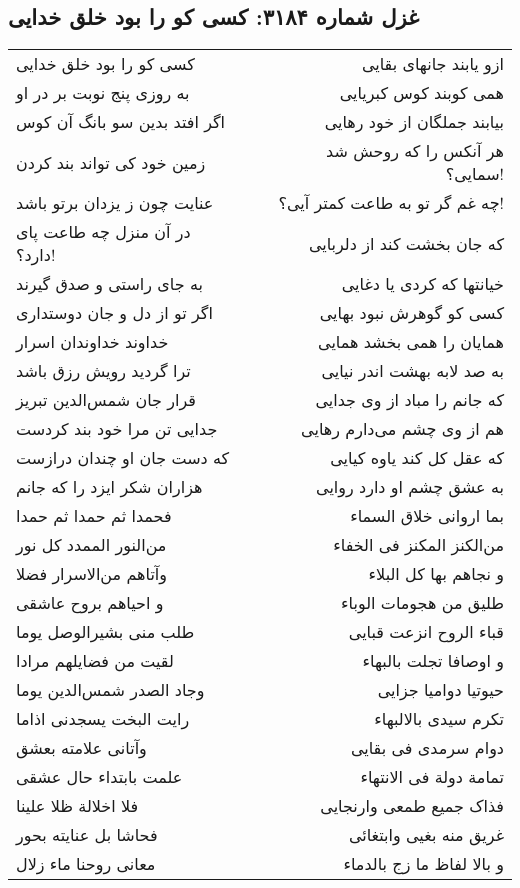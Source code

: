 \begin{center}
\section*{غزل شماره ۳۱۸۴: کسی کو را بود خلق خدایی}
\label{sec:3184}
\begin{longtable}{l p{0.5cm} r}
کسی کو را بود خلق خدایی
&&
ازو یابند جانهای بقایی
\\
به روزی پنج نوبت بر در او
&&
همی کوبند کوس کبریایی
\\
اگر افتد بدین سو بانگ آن کوس
&&
بیابند جملگان از خود رهایی
\\
زمین خود کی تواند بند کردن
&&
هر آنکس را که روحش شد سمایی؟!
\\
عنایت چون ز یزدان برتو باشد
&&
چه غم گر تو به طاعت کمتر آیی؟!
\\
در آن منزل چه طاعت پای دارد؟!
&&
که جان بخشت کند از دلربایی
\\
به جای راستی و صدق گیرند
&&
خیانتها که کردی یا دغایی
\\
اگر تو از دل و جان دوستداری
&&
کسی کو گوهرش نبود بهایی
\\
خداوند خداوندان اسرار
&&
همایان را همی بخشد همایی
\\
ترا گردید رویش رزق باشد
&&
به صد لابه بهشت اندر نیایی
\\
قرار جان شمس‌الدین تبریز
&&
که جانم را مباد از وی جدایی
\\
جدایی تن مرا خود بند کردست
&&
هم از وی چشم می‌دارم رهایی
\\
که دست جان او چندان درازست
&&
که عقل کل کند یاوه کیایی
\\
هزاران شکر ایزد را که جانم
&&
به عشق چشم او دارد روایی
\\
فحمدا ثم حمدا ثم حمدا
&&
بما اروانی خلاق السماء
\\
من‌النور الممدد کل نور
&&
من‌الکنز المکنز فی الخفاء
\\
وآتاهم من‌الاسرار فضلا
&&
و نجاهم بها کل البلاء
\\
و احیاهم بروح عاشقی
&&
طلیق من هجومات الوباء
\\
طلب منی بشیرالوصل یوما
&&
قباء الروح انزعت قبایی
\\
لقیت من فضایلهم مرادا
&&
و اوصافا تجلت بالبهاء
\\
وجاد الصدر شمس‌الدین یوما
&&
حیوتیا دوامیا جزایی
\\
رایت البخت یسجدنی اذاما
&&
تکرم سیدی بالالبهاء
\\
وآتانی علامته بعشق
&&
دوام سرمدی فی بقایی
\\
علمت بابتداء حال عشقی
&&
تمامة دولة فی الانتهاء
\\
فلا اخلالة ظلا علینا
&&
فذاک جمیع طمعی وارنجایی
\\
فحاشا بل عنایته بحور
&&
غریق منه بغیی وابتغائی
\\
معانی روحنا ماء زلال
&&
و بالا لفاظ ما زج بالدماء
\\
\end{longtable}
\end{center}
